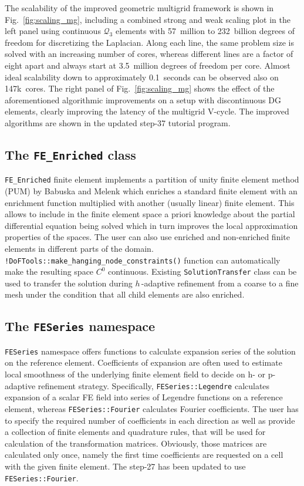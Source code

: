 \documentclass{ansarticle-preprint}
\begin{document}
The scalability of the improved geometric multigrid framework is shown in
Fig.~\ref{fig:scaling_mg}, including a combined strong and weak scaling plot
in the left panel using continuous $\mathcal Q_3$ elements with 57~million to
232~billion degrees of freedom for discretizing the Laplacian. Along each
line, the same problem size is solved with an increasing number of cores,
whereas different lines are a factor of eight apart and always start at
3.5~million degrees of freedom per core. Almost ideal scalability down to
approximately 0.1~seconds can be observed also on 147k~cores. The right panel
of Fig.~\ref{fig:scaling_mg} shows the effect of the aforementioned
algorithmic improvements on a setup with discontinuous DG elements, clearly
improving the latency of the multigrid V-cycle. The improved algorithms are
shown in the updated step-37 tutorial program.



\subsection{The \texttt{FE\_Enriched} class}

\verb!FE_Enriched! finite element implements a partition of unity finite element method (PUM) by Babuska and Melenk which enriches a standard finite element with an enrichment function multiplied with another (usually linear) finite element. This allows to include in the finite element space a priori knowledge about the partial differential equation being solved which in turn improves the local approximation properties of the spaces. The user can also use enriched and non-enriched finite elements in different parts of the domain. 
\verb|!DoFTools::make_hanging_node_constraints()| function can automatically make the resulting space $C^0$ continuous.
Existing \verb|SolutionTransfer| class can be used to transfer the solution during $h$\,-adaptive refinement from a coarse to a fine mesh under the condition that all child elements are also enriched.

\subsection{The \texttt{FESeries} namespace}

\verb|FESeries| namespace offers functions to calculate expansion series of the solution on the reference element.
Coefficients of expansion are often used to estimate local smoothness of the underlying finite element field to decide on h- or p-adaptive refinement strategy. Specifically, \verb|FESeries::Legendre| calculates expansion of a scalar FE field into series of Legendre functions on a reference element, whereas \verb|FESeries::Fourier| calculates Fourier coefficients. The user has to specify the required number of coefficients in each direction as well as provide a collection of finite elements and quadrature rules, that will be used for calculation of the transformation matrices. Obviously, those matrices are calculated only once, namely the first time coefficients are requested on a cell with the given finite element.
The step-27 has been updated to use \verb|FESeries::Fourier|.
\end{document}
